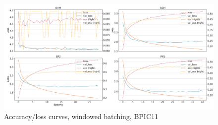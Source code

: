 \begin{figure}[!htb]
    \centering
    \includegraphics[width=\textwidth]{gfx/bpic2011/windowed_loss_acc_curve.pdf}
    \caption{Accuracy/loss curves, windowed batching, BPIC11}
\end{figure}
\FloatBarrier

